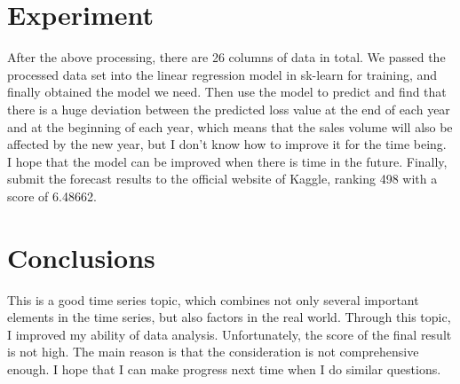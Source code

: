 \qwuMarker %

\section{Experiment} \label{sec-experiment}
After the above processing, there are 26 columns of data in total. We passed the processed data set into the linear regression model in sk-learn for training, and finally obtained the model we need. Then use the model to predict and find that there is a huge deviation between the predicted loss value at the end of each year and at the beginning of each year, which means that the sales volume will also be affected by the new year, but I don't know how to improve it for the time being. I hope that the model can be improved when there is time in the future. Finally, submit the forecast results to the official website of Kaggle, ranking 498 with a score of 6.48662.



\section{Conclusions} \label{sec-conclusions}
This is a good time series topic, which combines not only several important elements in the time series, but also factors in the real world. Through this topic, I improved my ability of data analysis. Unfortunately, the score of the final result is not high. The main reason is that the consideration is not comprehensive enough. I hope that I can make progress next time when I do similar questions.







